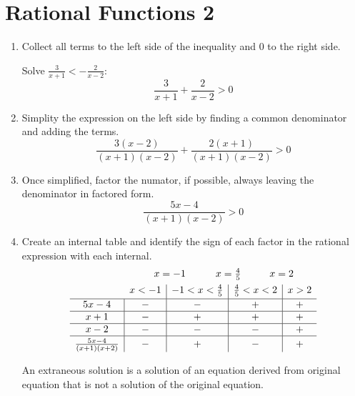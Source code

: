 \section{Rational Functions 2}
\begin{enumerate}
    \item Collect all terms to the left side of the inequality and $0$ to the right side.
        \begin{eg}
            Solve $\frac{3}{x+1}<-\frac{2}{x-2}$:
            \[
                \frac{3}{x+1}+\frac{2}{x-2}>0
            \]
        \end{eg}
    \item Simplity the expression on the left side by finding a common denominator and adding the terms.
        \[
            \frac{3(x-2)}{(x+1)(x-2)}+\frac{2(x+1)}{(x+1)(x-2)}>0
        \]
    \item Once simplified, factor the numator, if possible, always leaving the denominator in factored form.
        \[
            \frac{5x-4}{(x+1)(x-2)}>0
        \]
    \item Create an internal table and identify the sign of each factor in the rational expression with each internal.
        \[
            \begin{array}{c|c|c|c|c}
                \multicolumn{1}{c}{} & \multicolumn{4}{l}{\hspace{2.45em} x=-1 \hspace{3em} x=\frac{4}{5} \hspace{2.85em} x=2} \\[1ex]
                \multicolumn{1}{c}{} & x<-1 & -1<x<\frac{4}{5} & \frac{4}{5}<x<2 & x>2 \\[0.5ex] \hline
                5x-4 & - & - & + & + \\ \hline
                x+1  & - & + & + & + \\ \hline
                x-2  & - & - & - & + \\ \hline
                \rule{0pt}{2.5ex}
                \frac{5x-4}{(x+1)(x+2)} & - & + & - & +
            \end{array}
        \]
        \begin{note}
            An extraneous solution is a solution of an equation derived from original equation that is not a solution of the original equation.
        \end{note}
\end{enumerate}
